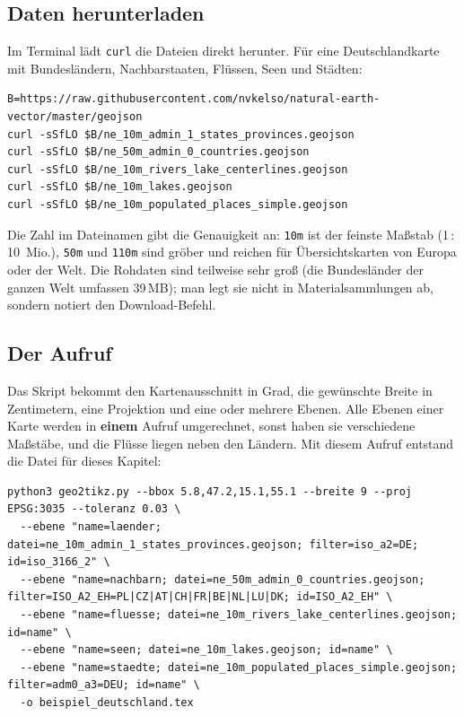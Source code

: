 \subsection{Daten herunterladen}

Im Terminal lädt \texttt{curl} die Dateien direkt herunter. Für eine Deutschlandkarte mit Bundesländern, Nachbarstaaten, Flüssen, Seen und Städten:

\begin{lstlisting}[style=latex]
B=https://raw.githubusercontent.com/nvkelso/natural-earth-vector/master/geojson
curl -sSfLO $B/ne_10m_admin_1_states_provinces.geojson
curl -sSfLO $B/ne_50m_admin_0_countries.geojson
curl -sSfLO $B/ne_10m_rivers_lake_centerlines.geojson
curl -sSfLO $B/ne_10m_lakes.geojson
curl -sSfLO $B/ne_10m_populated_places_simple.geojson
\end{lstlisting}

Die Zahl im Dateinamen gibt die Genauigkeit an: \texttt{10m} ist der feinste Maßstab (1\,:\,10~Mio.), \texttt{50m} und \texttt{110m} sind gröber und reichen für Übersichtskarten von Europa oder der Welt. Die Rohdaten sind teilweise sehr groß (die Bundesländer der ganzen Welt umfassen 39\,MB); man legt sie nicht in Materialsammlungen ab, sondern notiert den Download-Befehl.


\subsection{Der Aufruf}

Das Skript bekommt den Kartenausschnitt in Grad, die gewünschte Breite in Zentimetern, eine Projektion und eine oder mehrere Ebenen. Alle Ebenen einer Karte werden in \textbf{einem} Aufruf umgerechnet, sonst haben sie verschiedene Maßstäbe, und die Flüsse liegen neben den Ländern. Mit diesem Aufruf entstand die Datei für dieses Kapitel:

\begin{lstlisting}[style=latex]
python3 geo2tikz.py --bbox 5.8,47.2,15.1,55.1 --breite 9 --proj EPSG:3035 --toleranz 0.03 \
  --ebene "name=laender; datei=ne_10m_admin_1_states_provinces.geojson; filter=iso_a2=DE; id=iso_3166_2" \
  --ebene "name=nachbarn; datei=ne_50m_admin_0_countries.geojson; filter=ISO_A2_EH=PL|CZ|AT|CH|FR|BE|NL|LU|DK; id=ISO_A2_EH" \
  --ebene "name=fluesse; datei=ne_10m_rivers_lake_centerlines.geojson; id=name" \
  --ebene "name=seen; datei=ne_10m_lakes.geojson; id=name" \
  --ebene "name=staedte; datei=ne_10m_populated_places_simple.geojson; filter=adm0_a3=DEU; id=name" \
  -o beispiel_deutschland.tex
\end{lstlisting}

